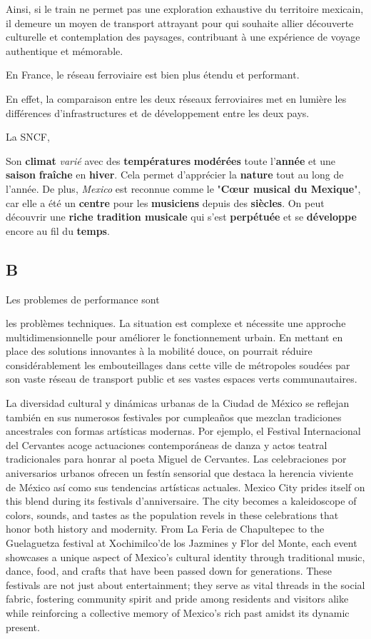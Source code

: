 \documentclass[12pt, a4paper]{article}
\begin{document}
Ainsi, si le train ne permet pas une exploration exhaustive du territoire mexicain, il demeure un moyen de transport attrayant pour qui souhaite allier découverte culturelle et contemplation des paysages, contribuant à une expérience de voyage authentique et mémorable.

En France, le réseau ferroviaire est bien plus étendu et performant.

En effet, la comparaison entre les deux réseaux ferroviaires met en lumière les différences d'infrastructures et de développement entre les deux pays.

La SNCF, 

Son \textbf{climat} \textit{varié} avec des \textbf{températures} \textbf{modérées} toute l’\textbf{année} et une \textbf{saison} \textbf{fraîche} en \textbf{hiver}. Cela permet d’apprécier la \textbf{nature} tout au long de l’année. De plus, \textit{Mexico} est reconnue comme le "\textbf{Cœur musical du Mexique}", car elle a été un \textbf{centre} pour les \textbf{musiciens} depuis des \textbf{siècles}. On peut découvrir une \textbf{riche tradition musicale} qui s’est \textbf{perpétuée} et se \textbf{développe} encore au fil du \textbf{temps}.



\subsection{B}



Les problemes de performance sont 

les problèmes techniques. La situation est complexe et nécessite une approche multidimensionnelle pour améliorer le fonctionnement urbain. En mettant en place des solutions innovantes à la mobilité douce, on pourrait réduire considérablement les embouteillages dans cette ville de métropoles soudées par son vaste réseau de transport public et ses vastes espaces verts communautaires.


La diversidad cultural y dinámicas urbanas de la Ciudad de México se reflejan también en sus numerosos festivales por cumpleaños que mezclan tradiciones ancestrales con formas artísticas modernas. Por ejemplo, el Festival Internacional del Cervantes acoge actuaciones contemporáneas de danza y actos teatral tradicionales para honrar al poeta Miguel de Cervantes. Las celebraciones por aniversarios urbanos ofrecen un festín sensorial que destaca la herencia viviente de México así como sus tendencias artísticas actuales.
Mexico City prides itself on this blend during its festivals d’anniversaire. The city becomes a kaleidoscope of colors, sounds, and tastes as the population revels in these celebrations that honor both history and modernity. From La Feria de Chapultepec to the Guelaguetza festival at Xochimilco'de los Jazmines y Flor del Monte, each event showcases a unique aspect of Mexico’s cultural identity through traditional music, dance, food, and crafts that have been passed down for generations. These festivals are not just about entertainment; they serve as vital threads in the social fabric, fostering community spirit and pride among residents and visitors alike while reinforcing a collective memory of Mexico’s rich past amidst its dynamic present.
\end{document}
